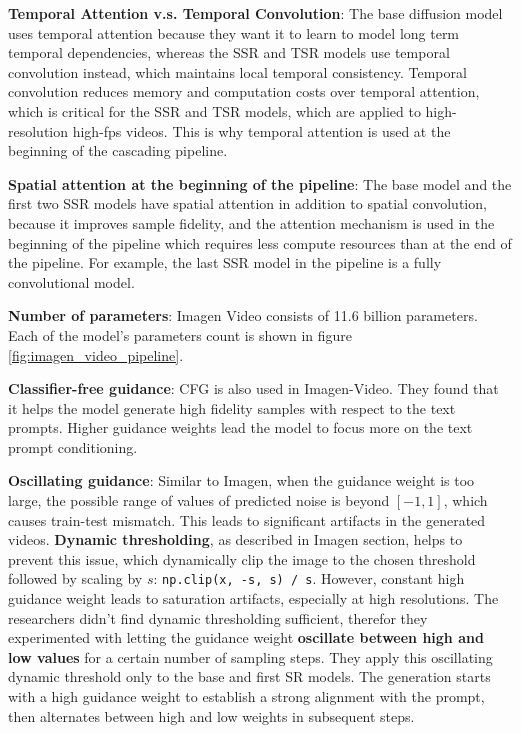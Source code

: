 \textbf{Temporal Attention v.s. Temporal Convolution}: The base diffusion model uses temporal attention because they want it to learn to model long term temporal dependencies, whereas the SSR and TSR models use temporal convolution instead, which maintains local temporal consistency. Temporal convolution reduces memory and computation costs over temporal attention, which is critical for the SSR and TSR models, which are applied to high-resolution high-fps videos. This is why temporal attention is used at the beginning of the cascading pipeline.

\textbf{Spatial attention at the beginning of the pipeline}: The base model and the first two SSR models have spatial attention in addition to spatial convolution, because it improves sample fidelity, and the attention mechanism is used in the beginning of the pipeline which requires less compute resources than at the end of the pipeline. For example, the last SSR model in the pipeline is a fully convolutional model.

\textbf{Number of parameters}: Imagen Video consists of 11.6 billion parameters. Each of the model's parameters count is shown in figure \ref{fig:imagen_video_pipeline}.

\textbf{Classifier-free guidance}: CFG is also used in Imagen-Video. They found that it helps the model generate high fidelity samples with respect to the text prompts. Higher guidance weights lead the model to focus more on the text prompt conditioning.

\textbf{Oscillating guidance}: Similar to Imagen, when the guidance weight is too large, the possible range of values of predicted noise is beyond $[-1, 1]$, which causes train-test mismatch. This leads to significant artifacts in the generated videos. \textbf{Dynamic thresholding}, as described in Imagen section, helps to prevent this issue, which dynamically clip the image to the chosen threshold followed by scaling by $s$: \texttt{np.clip(x, -s, s) / s}. However, constant high guidance weight leads to saturation artifacts, especially at high resolutions. The researchers didn't find dynamic thresholding sufficient, therefor they experimented with letting the guidance weight \textbf{oscillate between high and low values} for a certain number of sampling steps. They apply this oscillating dynamic threshold only to the base and first SR models. The generation starts with a high guidance weight to establish a strong alignment with the prompt, then alternates between high and low weights in subsequent steps.













